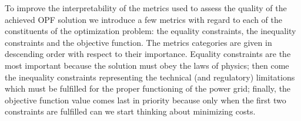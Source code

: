 To improve the interpretability of the metrics used to assess the quality of the achieved OPF solution
we introduce a few metrics with regard to each of the constituents of the optimization problem:
the equality constraints, the inequality constraints and the objective function.
The metrics categories are given in descending order with respect to their importance.
Equality constraints are the most important because the solution must obey the laws of physics;
then come the inequality constraints representing the technical (and regulatory) limitations
which must be fulfilled for the proper functioning of the power grid;
finally, the objective function value comes last in priority because only when the
first two constraints are fulfilled can we start thinking about minimizing costs.